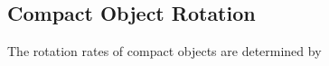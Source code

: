 {\color{orange}

\subsection{Compact Object Rotation}

The rotation rates of compact objects are determined by 

}
